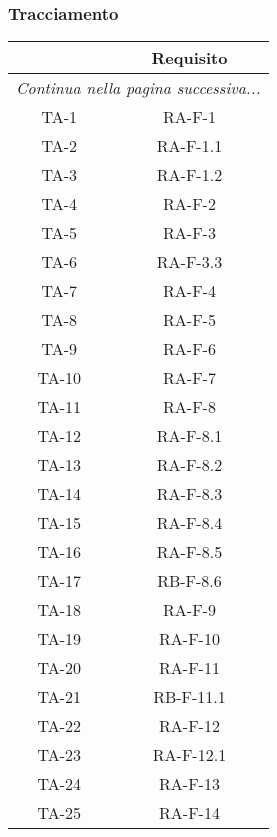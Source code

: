	\subsubsection{Tracciamento}
		\begin{center}
			\begin{longtable}{|c|c|}
			\hline
			\rowcolor{lighter-grayer}{ \textbf{Codice} } & {\textbf{Requisito} } \\ \hline
			\endhead
			\multicolumn{2}{|c|}{\textit{Continua nella pagina successiva...}}\\
			\hline
			\hline
			\endfoot
			\endlastfoot

			\hline
			TA-1 & RA-F-1 \\
			\hline
			TA-2 & RA-F-1.1 \\
			\hline
			TA-3 & RA-F-1.2 \\
			\hline
			TA-4 & RA-F-2 \\
			\hline
			TA-5 & RA-F-3 \\
			\hline
			TA-6 & RA-F-3.3 \\
			\hline
			TA-7 & RA-F-4 \\
			\hline
			TA-8 & RA-F-5 \\
			\hline
			TA-9 & RA-F-6 \\
			\hline
			TA-10 & RA-F-7 \\
			\hline
			TA-11 & RA-F-8 \\
			\hline
			TA-12 & RA-F-8.1 \\
			\hline
			TA-13 & RA-F-8.2 \\
			\hline
			TA-14 & RA-F-8.3 \\
			\hline
			TA-15 & RA-F-8.4 \\
			\hline
			TA-16 & RA-F-8.5 \\
			\hline
			TA-17 & RB-F-8.6 \\
			\hline
			TA-18 & RA-F-9 \\
			\hline
			TA-19 & RA-F-10 \\
			\hline
			TA-20 & RA-F-11 \\
			\hline
			TA-21 & RB-F-11.1 \\
			\hline
			TA-22 & RA-F-12 \\
			\hline
			TA-23 & RA-F-12.1 \\
			\hline
			TA-24 & RA-F-13 \\
			\hline
			TA-25 & RA-F-14 \\

\end{longtable}
\end{center}
